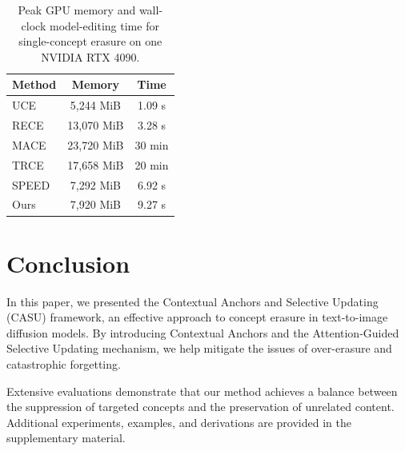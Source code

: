 \documentclass[letterpaper]{article} %
\begin{document}
\begin{table}[b]
\centering
\small
\setlength{\tabcolsep}{5pt}
\caption{Peak GPU memory and wall-clock model-editing time for single-concept erasure on one NVIDIA RTX 4090.}
\label{tab:app-resource}
\begin{tabular}{lcc}
\toprule
Method & Memory & Time \\
\midrule
UCE & 5,244 MiB & 1.09 s \\
RECE & 13,070 MiB & 3.28 s \\
MACE & 23,720 MiB & 30 min \\
TRCE & 17,658 MiB & 20 min \\
SPEED & 7,292 MiB & 6.92 s \\
Ours & 7,920 MiB & 9.27 s \\
\bottomrule
\end{tabular}
\end{table}

\section{Conclusion}
In this paper, we presented the Contextual Anchors and Selective Updating (CASU) framework, an effective approach to concept erasure in text-to-image diffusion models. By introducing Contextual Anchors and the Attention-Guided Selective Updating mechanism, we help mitigate the issues of over-erasure and catastrophic forgetting.

Extensive evaluations demonstrate that our method achieves a balance between the suppression of targeted concepts and the preservation of unrelated content. Additional experiments, examples, and derivations are provided in the supplementary material.





\end{document}
